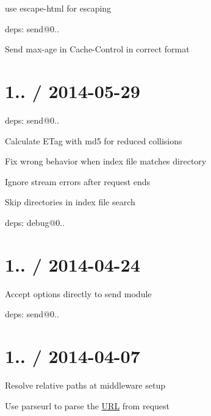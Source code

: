\begin{DoxyItemize}
\item use {\ttfamily escape-\/html} for escaping
\item deps\+: send@0..
\begin{DoxyItemize}
\item Send {\ttfamily max-\/age} in {\ttfamily Cache-\/\+Control} in correct format
\end{DoxyItemize}
\end{DoxyItemize}

\section*{1.. / 2014-\/05-\/29 }


\begin{DoxyItemize}
\item deps\+: send@0..
\begin{DoxyItemize}
\item Calculate E\+Tag with md5 for reduced collisions
\item Fix wrong behavior when index file matches directory
\item Ignore stream errors after request ends
\item Skip directories in index file search
\item deps\+: debug@0..
\end{DoxyItemize}
\end{DoxyItemize}

\section*{1.. / 2014-\/04-\/24 }


\begin{DoxyItemize}
\item Accept options directly to {\ttfamily send} module
\item deps\+: send@0..
\end{DoxyItemize}

\section*{1.. / 2014-\/04-\/07 }


\begin{DoxyItemize}
\item Resolve relative paths at middleware setup
\item Use parseurl to parse the \mbox{\hyperlink{namespace_u_r_l}{U\+RL}} from request
\end{DoxyItemize}

